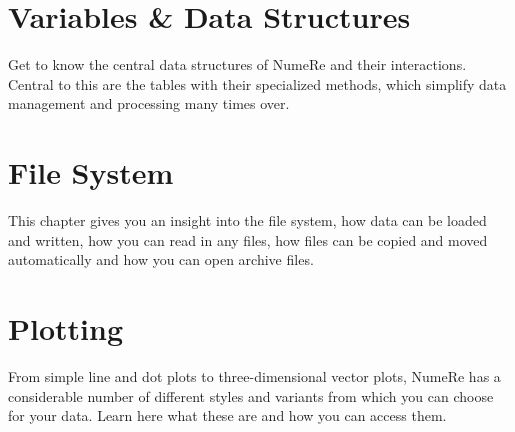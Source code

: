 \documentclass[DIV=17, parskip=half]{scrreprt}
\begin{document}
	\chapter{Variables \& Data Structures}
		Get to know the central data structures of NumeRe and their interactions. Central to this are the tables with their specialized methods, which simplify data management and processing many times over.
		
		
		
		
		
		
		
		
		
	
	\chapter{File System}
		This chapter gives you an insight into the file system, how data can be loaded and written, how you can read in any files, how files can be copied and moved automatically and how you can open archive files.
		
		
		
		
		
		
		
	
	\chapter{Plotting}
		From simple line and dot plots to three-dimensional vector plots, NumeRe has a considerable number of different styles and variants from which you can choose for your data. Learn here what these are and how you can access them.
		
		
		
		
		
		
		
		
		
		
		
		
		
		
		
		
		
	
\end{document}
